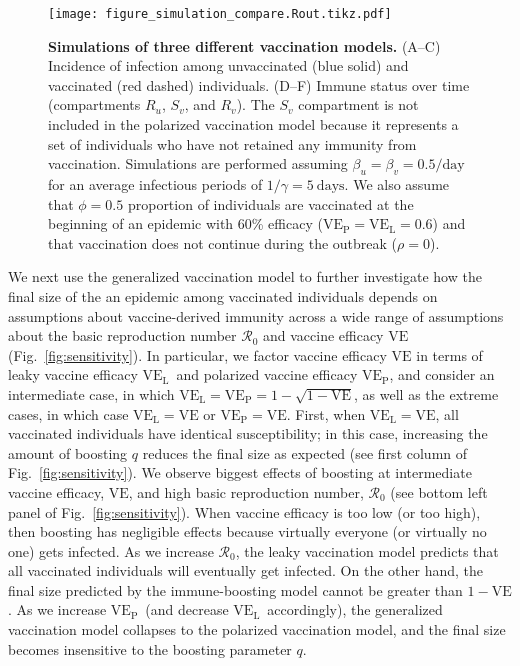 \documentclass[12pt]{article}
\newcommand{\fref}[1]{Fig.~\ref{fig:#1}}
\newcommand{\VE}{\ensuremath{\mathrm{VE}}}
\newcommand{\VEP}{\ensuremath{\VE_{\mathrm{P}}}}
\newcommand{\VEL}{\ensuremath{\VE_{\mathrm{L}}}}
\begin{document}
\begin{figure}[!th]
\texttt{[image: figure\_simulation\_compare.Rout.tikz.pdf]}
\caption{
\textbf{Simulations of three different vaccination models.}
(A--C) Incidence of infection among unvaccinated (blue solid) and vaccinated (red dashed) individuals.
(D--F) Immune status over time (compartments $R_u$, $S_v$, and $R_v$).
The $S_v$ compartment is not included in the polarized vaccination model because it represents a set of individuals who have not retained any immunity from vaccination.
Simulations are performed assuming $\beta_u = \beta_v =0.5/\mathrm{day}$ for an average infectious periods of $1/\gamma=5~\mathrm{days}$.
We also assume that $\phi = 0.5$ proportion of individuals are vaccinated at the beginning of an epidemic with 60\% efficacy ($\VEP=\VEL=0.6$) and that vaccination does not continue during the outbreak ($\rho = 0$).
\label{fig:simulation}
}
\end{figure}

We next use the generalized vaccination model to further investigate how the final size of the an epidemic among vaccinated individuals depends on assumptions about vaccine-derived immunity across a wide range of assumptions about the basic reproduction number $\mathcal R_0$ and vaccine efficacy $\VE$ (\fref{sensitivity}).
In particular, we factor vaccine efficacy $\VE$ in terms of leaky vaccine efficacy \VEL\ and polarized vaccine efficacy \VEP, and consider an intermediate case, in which $\VEL = \VEP = 1 - \sqrt{1-\VE}$, as well as the extreme cases, in which case $\VEL = \VE$ or $\VEP = \VE$.
First, when $\VEL = \VE$, all vaccinated individuals have identical susceptibility;
in this case, increasing the amount of boosting $q$ reduces the final size as expected (see first column of \fref{sensitivity}).
We observe biggest effects of boosting at intermediate vaccine efficacy, $\VE$, and high basic reproduction number, $\mathcal R_0$ (see bottom left panel of \fref{sensitivity}).
When vaccine efficacy is too low (or too high), then boosting has negligible effects because virtually everyone (or virtually no one) gets infected.
As we increase $\mathcal R_0$, the leaky vaccination model predicts that all vaccinated individuals will eventually get infected.
On the other hand, the final size predicted by the immune-boosting model cannot be greater than $1-\VE$.
As we increase \VEP\ (and decrease \VEL\ accordingly), the generalized vaccination model collapses to the polarized vaccination model, and the final size becomes insensitive to the boosting parameter $q$.
\end{document}

